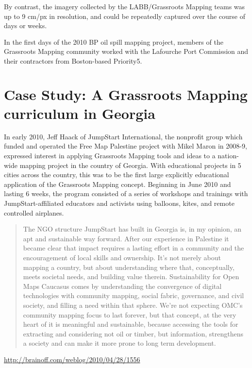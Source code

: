 \documentclass[11pt]{report}
\begin{document}

By contrast, the imagery collected by the LABB/Grassroots Mapping teams was up to 9 cm/px in resolution, and could be repeatedly captured over the course of days or weeks.  

In the first days of the 2010 BP oil spill mapping project, members of the Grassroots Mapping community worked with the Lafourche Port Commission and their contractors from Boston-based Priority5. 

\chapter{Case Study: A Grassroots Mapping curriculum in Georgia}

In early 2010, Jeff Haack of JumpStart International, the nonprofit group which funded and operated the Free Map Palestine project with Mikel Maron in 2008-9, expressed interest in applying Grassroots Mapping tools and ideas to a nation-wide mapping project in the country of Georgia. With educational projects in 5 cities across the country, this was to be the first large explicitly educational application of the Grassroots Mapping concept. Beginning in June 2010 and lasting 6 weeks, the program consisted of a series of workshops and trainings with JumpStart-affiliated educators and activists using balloons, kites, and remote controlled airplanes.

\begin{quote}The NGO structure JumpStart has built in Georgia is, in my opinion, an apt and sustainable way forward. After our experience in Palestine it became clear that impact requires a lasting effort in a community and the encouragement of local skills and ownership. It’s not merely about mapping a country, but about understanding where that, conceptually, meets societal needs, and building value therein. Sustainability for Open Maps Caucasus comes by understanding the convergence of digital technologies with community mapping, social fabric, governance, and civil society, and filling a need within that sphere. We’re not expecting OMC’s community mapping focus to last forever, but that concept, at the very heart of it is meaningful and sustainable, because accessing the tools for extracting and considering not oil or timber, but information, strengthens a society and can make it more prone to long term development.\end{quote} \url{http://brainoff.com/weblog/2010/04/28/1556}
\end{document}

